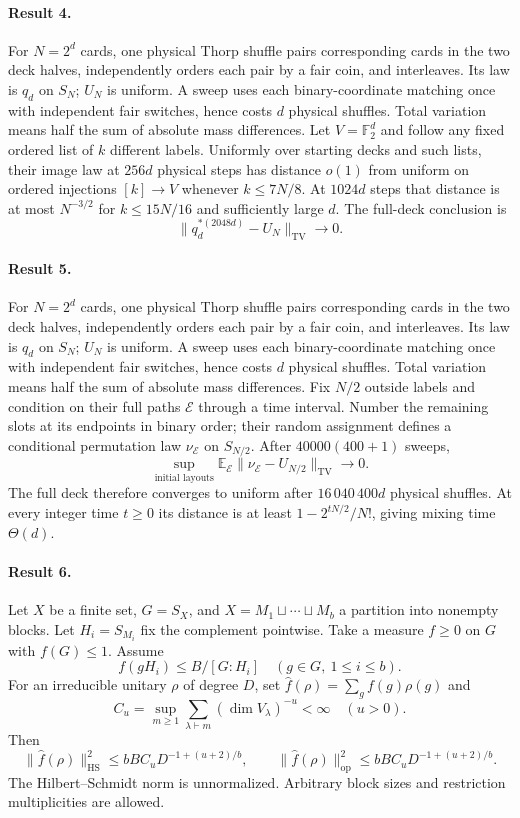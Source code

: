 \documentclass[11pt]{article}
\begin{document}
\paragraph{Result 4.} For $N=2^d$ cards, one physical Thorp shuffle pairs corresponding cards in the two deck halves, independently orders each pair by a fair coin, and interleaves. Its law is $q_d$ on $S_N$; $U_N$ is uniform. A sweep uses each binary-coordinate matching once with independent fair switches, hence costs $d$ physical shuffles. Total variation means half the sum of absolute mass differences. Let $V=\mathbb F_2^d$ and follow any fixed ordered list of $k$ different labels. Uniformly over starting decks and such lists, their image law at $256d$ physical steps has distance $o(1)$ from uniform on ordered injections $[k]\to V$ whenever $k\le7N/8$. At $1024d$ steps that distance is at most $N^{-3/2}$ for $k\le15N/16$ and sufficiently large $d$. The full-deck conclusion is
\[
 \|q_d^{*(2048d)}-U_N\|_{\mathrm{TV}}\longrightarrow0.
\]

\paragraph{Result 5.} For $N=2^d$ cards, one physical Thorp shuffle pairs corresponding cards in the two deck halves, independently orders each pair by a fair coin, and interleaves. Its law is $q_d$ on $S_N$; $U_N$ is uniform. A sweep uses each binary-coordinate matching once with independent fair switches, hence costs $d$ physical shuffles. Total variation means half the sum of absolute mass differences. Fix $N/2$ outside labels and condition on their full paths $\mathcal E$ through a time interval. Number the remaining slots at its endpoints in binary order; their random assignment defines a conditional permutation law $\nu_{\mathcal E}$ on $S_{N/2}$. After $40000(400+1)$ sweeps,
\[
 \sup_{\text{initial layouts}}\mathbb E_{\mathcal E}
 \|\nu_{\mathcal E}-U_{N/2}\|_{\mathrm{TV}}\longrightarrow0.
\]
The full deck therefore converges to uniform after $16\,040\,400d$ physical shuffles. At every integer time $t\ge0$ its distance is at least $1-2^{tN/2}/N!$, giving mixing time $\Theta(d)$.

\paragraph{Result 6.} Let $X$ be a finite set, $G=S_X$, and $X=M_1\sqcup\cdots\sqcup M_b$ a partition into nonempty blocks. Let $H_i=S_{M_i}$ fix the complement pointwise. Take a measure $f\ge0$ on $G$ with $f(G)\le1$. Assume
\[
 f(gH_i)\le B/[G:H_i]\quad(g\in G,\ 1\le i\le b).
\]
For an irreducible unitary $\rho$ of degree $D$, set $\widehat f(\rho)=\sum_gf(g)\rho(g)$ and
\[
 C_u=\sup_{m\ge1}\sum_{\lambda\vdash m}(\dim V_\lambda)^{-u}<\infty\quad(u>0).
\]
Then
\[
 \|\widehat f(\rho)\|_{\mathrm{HS}}^2\le bBC_uD^{-1+(u+2)/b},\qquad
 \|\widehat f(\rho)\|_{\mathrm{op}}^2\le bBC_uD^{-1+(u+2)/b}.
\]
The Hilbert--Schmidt norm is unnormalized. Arbitrary block sizes and restriction multiplicities are allowed.
\end{document}
